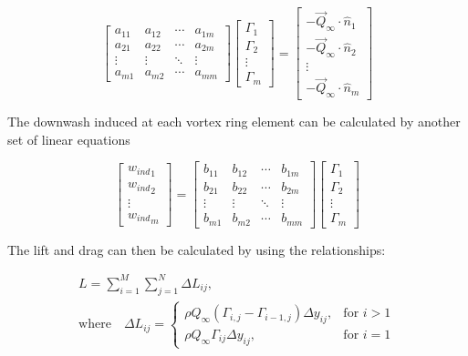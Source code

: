 \begin{equation}
\begin{bmatrix}
a_{11} & a_{12} & \cdots & a_{1m} \\
a_{21} & a_{22} & \cdots & a_{2m} \\
 \vdots & \vdots & \ddots & \vdots \\
a_{m1} & a_{m2} & \cdots & a_{mm}
\end{bmatrix}\begin{bmatrix}
\Gamma_{1} \\
\Gamma_{2} \\
 \vdots \\
\Gamma_{m}
\end{bmatrix} = \begin{bmatrix}
 - {\vec{Q}}_{\infty} \cdot {\hat{n}}_{1} \\
 - {\vec{Q}}_{\infty} \cdot {\hat{n}}_{2} \\
 \vdots \\
 - {\vec{Q}}_{\infty} \cdot {\hat{n}}_{m}
\end{bmatrix}
\end{equation}


The downwash induced at each vortex ring element can be calculated by another set of linear equations

\begin{equation}
\begin{bmatrix}
{w_{ind}}_{1} \\
{w_{ind}}_{2} \\
 \vdots \\
{w_{ind}}_{m}
\end{bmatrix} = \begin{bmatrix}
b_{11} & b_{12} & \cdots & b_{1m} \\
b_{21} & b_{22} & \cdots & b_{2m} \\
 \vdots & \vdots & \ddots & \vdots \\
b_{m1} & b_{m2} & \cdots & b_{mm}
\end{bmatrix}\begin{bmatrix}
\Gamma_{1} \\
\Gamma_{2} \\
 \vdots \\
\Gamma_{m}
\end{bmatrix}
\end{equation}


The lift and drag can then be calculated by using the relationships:

\begin{multline}
    L = \sum_{i = 1}^{M} \sum_{j = 1}^{N} \Delta L_{ij}, \\
    \text{where} \quad \Delta L_{ij} = \begin{cases}
      \rho Q_{\infty} \left( \Gamma_{i,j} - \Gamma_{i - 1,j} \right) \Delta y_{ij}, & \text{for } i > 1 \\
      \rho Q_{\infty} \Gamma_{ij} \Delta y_{ij}, & \text{for } i = 1
    \end{cases}
  \end{multline}

